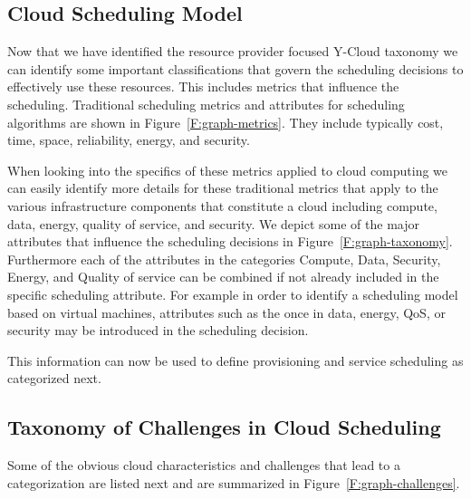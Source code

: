 \documentclass[final,5p,times,twocolumn]{elsarticle}
\begin{document}


\subsection{Cloud Scheduling Model}

Now that we have identified the resource provider focused Y-Cloud
taxonomy we can identify some important classifications that govern the
scheduling decisions to effectively use these resources. This includes
metrics that influence the scheduling. Traditional scheduling metrics
and attributes for scheduling algorithms are shown in
Figure~\ref{F:graph-metrics}. They include typically cost, time, space,
reliability, energy, and security.



When looking into the specifics of these metrics applied to cloud
computing we can easily identify more details for these traditional
metrics that apply to the various infrastructure components that
constitute a cloud including compute, data, energy, quality of
service, and security. We depict some of the major attributes that
influence the scheduling decisions in Figure~\ref{F:graph-taxonomy}.
Furthermore each of the attributes in the categories Compute, Data,
Security, Energy, and Quality of service can be combined if not
already included in the specific scheduling attribute. For example in
order to identify a scheduling model based on virtual machines,
attributes such as the once in data, energy, QoS, or security may be
introduced in the scheduling decision.



This information can now be used to define provisioning and service
scheduling as categorized next.

\subsection{Taxonomy of Challenges in Cloud Scheduling}\label{sec:challange}

Some of the obvious cloud characteristics and challenges that lead to
a categorization are listed next and are summarized in
Figure~\ref{F:graph-challenges}.
\end{document}
